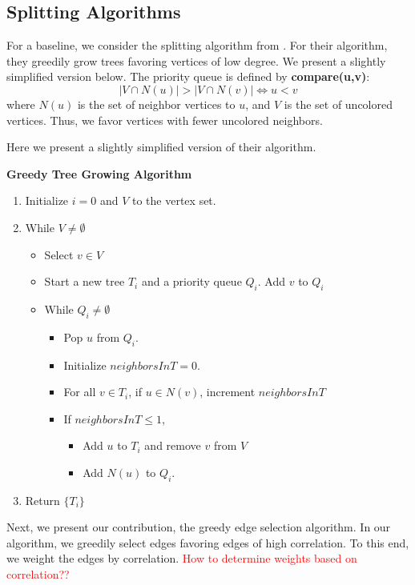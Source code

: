 \documentclass{article} %
\begin{document}
\subsection{Splitting Algorithms}%
For a baseline, we consider the splitting algorithm from \cite{rivasseau2005jungle}. For their algorithm, they greedily grow trees favoring vertices of low degree. We present a slightly simplified version below. The priority queue is defined by
\noindent\textbf{compare(u,v)}: 
\[
|V\cap N(u)|>|V\cap N(v)| \iff u<v
\]
where $N(u)$ is the set of neighbor vertices to $u$, and $V$ is the set of uncolored vertices. Thus, we favor vertices with fewer uncolored neighbors.

\noindent Here we present a slightly simplified version of their algorithm.\\

\begin{framed}
\noindent\textbf{Greedy Tree Growing Algorithm \cite{rivasseau2005jungle}}
\begin{enumerate}
\item Initialize $i=0$ and $V$ to the vertex set.
\item While $V\neq\emptyset$
\begin{itemize}
\item Select $v\in V$
\item Start a new tree $T_i$ and a priority queue $Q_i$. Add $v$ to $Q_i$
\item While $Q_i\neq\emptyset$
\begin{itemize}
\item Pop $u$ from $Q_i$.
\item Initialize $neighborsInT=0$.
\item For all $v\in T_i$, if $u\in N(v)$, increment $neighborsInT$
\item If $neighborsInT\le1$,
\begin{itemize}
\item Add $u$ to $T_i$ and remove $v$ from $V$
\item Add $N(u)$ to $Q_i$.
\end{itemize}
\end{itemize}
\end{itemize}
\item Return $\{T_i\}$
\end{enumerate}
\end{framed}

Next, we present our contribution, the greedy edge selection algorithm. In our algorithm, we greedily select edges favoring edges of high correlation. To this end, we weight the edges by correlation.
\textcolor{red}{How to determine weights based on correlation??}
\end{document}
